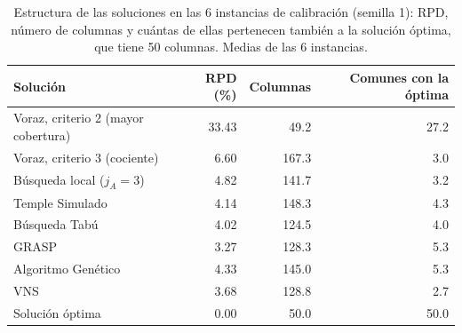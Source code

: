 \begin{table}[H]
\centering
\caption{Estructura de las soluciones en las 6 instancias de calibración (semilla 1): RPD, número de columnas y cuántas de ellas pertenecen también a la solución óptima, que tiene 50 columnas. Medias de las 6 instancias.}
\label{tab:estructura}
\begin{tabular}{@{}lrrr@{}}
\toprule
Solución & RPD (\%) & Columnas & Comunes con la óptima \\ \midrule
Voraz, criterio 2 (mayor cobertura) & 33.43 & 49.2 & 27.2 \\
Voraz, criterio 3 (cociente) & 6.60 & 167.3 & 3.0 \\
Búsqueda local ($j_A=3$) & 4.82 & 141.7 & 3.2 \\
\midrule
Temple Simulado & 4.14 & 148.3 & 4.3 \\
Búsqueda Tabú & 4.02 & 124.5 & 4.0 \\
GRASP & 3.27 & 128.3 & 5.3 \\
Algoritmo Genético & 4.33 & 145.0 & 5.3 \\
VNS & 3.68 & 128.8 & 2.7 \\
Solución óptima & 0.00 & 50.0 & 50.0 \\
\bottomrule
\end{tabular}
\end{table}
